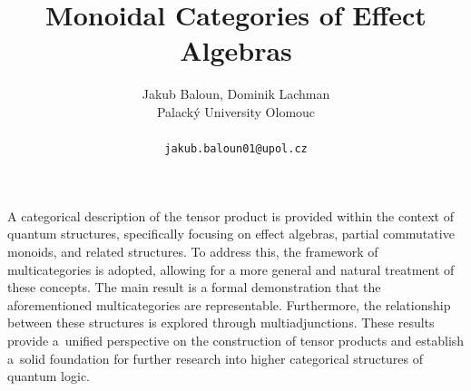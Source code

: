 \documentclass[a4paper]{article} %
\date{} %
\begin{document}
\setcounter{page}{1} %

\title{Monoidal Categories of Effect Algebras}

\author{Jakub Baloun, Dominik Lachman \\ %
       Palacký University Olomouc\\ \\ %
       \texttt{jakub.baloun01@upol.cz} %
       }%

\maketitle


A categorical description of the tensor product is provided within the context of quantum structures, specifically focusing on effect algebras, partial commutative monoids, and related structures. To address this, the framework of multicategories is adopted, allowing for a more general and natural treatment of these concepts. The main result is a formal demonstration that the aforementioned multicategories are representable. Furthermore, the relationship between these structures is explored through multiadjunctions. These results provide a~unified perspective on the construction of tensor products and establish a~solid foundation for further research into higher categorical structures of quantum logic.


\end{document}
